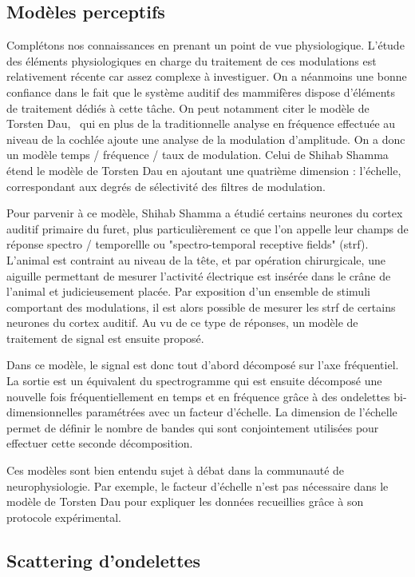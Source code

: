 \subsection{Modèles perceptifs}

Complétons nos connaissances en prenant un point de vue physiologique. L'étude des éléments physiologiques en charge du traitement de ces modulations est relativement récente car assez complexe à investiguer. On a néanmoins une bonne confiance dans le fait que le système auditif des mammifères dispose d'éléments de traitement dédiés à cette tâche. On peut notamment citer le modèle de Torsten Dau,~\cite{dau1997modeling} qui en plus de la traditionnelle analyse en fréquence effectuée au niveau de la cochlée ajoute une analyse de la modulation d'amplitude. On a donc un modèle temps / fréquence / taux de modulation. Celui de Shihab Shamma~\cite{fritz2003rapid} étend le modèle de Torsten Dau en ajoutant une quatrième dimension : l'échelle, correspondant aux degrés de sélectivité des filtres de modulation.

Pour parvenir à ce modèle, Shihab Shamma a étudié certains neurones du cortex auditif primaire du furet, plus particulièrement ce que l'on appelle leur champs de réponse spectro / temporellle ou "spectro-temporal receptive fields" (strf). L'animal est contraint au niveau de la tête, et par opération chirurgicale, une aiguille permettant de mesurer l'activité électrique est insérée dans le crâne de l'animal et judicieusement placée. Par exposition d'un ensemble de stimuli comportant des modulations, il est alors possible de mesurer les strf de certains neurones du cortex auditif. Au vu de ce type de réponses, un modèle de traitement de signal est ensuite proposé.

Dans ce modèle, le signal est donc tout d'abord décomposé sur l'axe fréquentiel. La sortie est un équivalent du spectrogramme qui est ensuite décomposé une nouvelle fois fréquentiellement en temps et en fréquence grâce à des ondelettes bi-dimensionnelles paramétrées avec un facteur d'échelle. La dimension de l'échelle permet de définir le nombre de bandes qui sont conjointement utilisées pour effectuer cette seconde décomposition.

Ces modèles sont bien entendu sujet à débat dans la communauté de neurophysiologie. Par exemple, le facteur d'échelle n'est pas nécessaire dans le modèle de Torsten Dau pour expliquer les données recueillies grâce à son protocole expérimental.

\subsection{\nmu Scattering d'ondelettes}  \label{sec:scattering}

